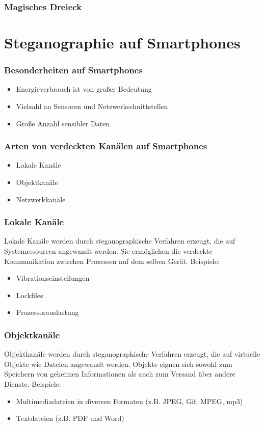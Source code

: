 \documentclass{beamer}
\begin{document}
\begin{frame}  
\frametitle{Magisches Dreieck}
\centering
    \def\svgwidth{\columnwidth}
    
\end{frame}

\section{Steganographie auf Smartphones}

\begin{frame}
  \frametitle{Besonderheiten auf Smartphones}
  \begin{itemize}
    \item Energieverbrauch ist von großer Bedeutung
    \item Vielzahl an Sensoren und Netzwerkschnittstellen
    \item Große Anzahl sensibler Daten
  \end{itemize}
\end{frame}

\begin{frame}
    \frametitle{Arten von verdeckten Kanälen auf Smartphones}
	  \begin{itemize}
	    \item Lokale Kanäle
	    \item Objektkanäle
	    \item Netzwerkkanäle
	  \end{itemize}
\end{frame}

\begin{frame}
  \frametitle{Lokale Kanäle}
  Lokale Kanäle werden durch steganographische Verfahren erzeugt, die auf Systemresourcen angewandt werden.
  Sie ermöglichen die verdeckte Kommunikation zwischen Prozessen auf dem selben Gerät.
  Beispiele:
  \begin{itemize}
    \item Vibrationseinstellungen
    \item Lockfiles
    \item Prozessorauslastung
  \end{itemize}
\end{frame}

\begin{frame}
  \frametitle{Objektkanäle}
  Objektkanäle werden durch steganographische Verfahren erzeugt, die auf virtuelle Objekte wie Dateien angewandt werden.
  Objekte eignen sich sowohl zum Speichern von geheimen Informationen als auch zum Versand über andere Dienste.
  Beispiele:
  \begin{itemize}
    \item Multimediadateien in diversen Formaten (z.B. JPEG, Gif, MPEG, mp3)
    \item Textdateien (z.B. PDF und Word)
  \end{itemize}
\end{frame}
\end{document}
